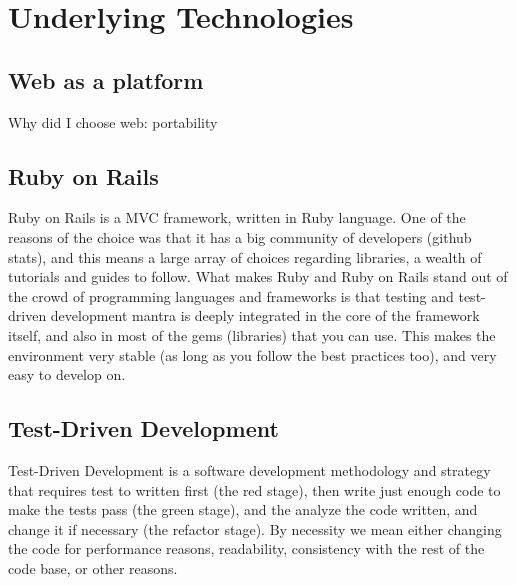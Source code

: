 
\chapter{Underlying Technologies}

\section{Web as a platform}
Why did I choose web: portability

\section{Ruby on Rails}
Ruby on Rails is a MVC framework, written in Ruby language. One of the reasons of the
choice was that it has a big community of developers (github stats), and this
means a large array of choices regarding libraries, a wealth of tutorials and
guides to follow.
What makes Ruby and Ruby on Rails stand out of the crowd of programming languages
and frameworks is that testing and test-driven development mantra is deeply
integrated in the core of the framework itself, and also in most of the gems
(libraries) that you can use. This makes the environment very stable (as long as you follow
the best practices too), and very easy to develop on.

\section{Test-Driven Development}
Test-Driven Development is a software development methodology and strategy that
requires test to written first (the red stage), then write just enough code to
make the tests pass (the green stage), and the analyze the code written, and
change it if necessary (the refactor stage). By necessity we mean either changing
the code for performance reasons, readability, consistency with the rest of the
code base, or other reasons.


